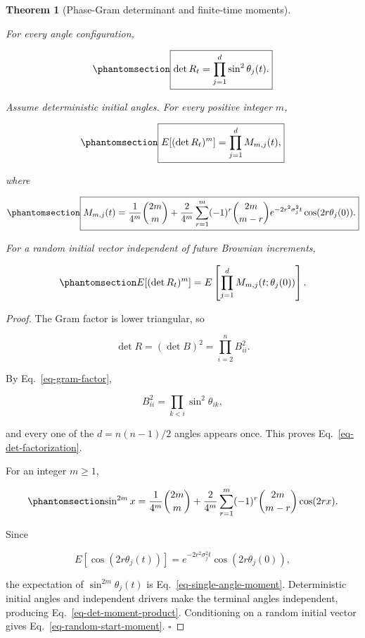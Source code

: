 \documentclass[
  english,
  11pt,
  letterpaper,
  DIV=11,
  numbers=noendperiod]{scrartcl}
\theoremstyle{plain}
\newtheorem{theorem}{Theorem}[section]
\theoremstyle{plain}
\theoremstyle{plain}
\theoremstyle{plain}
\theoremstyle{remark}
\begin{document}
\begin{theorem}[Phase-Gram determinant and finite-time
moments]\protect\hypertarget{thm-phasegram-determinant}{}\label{thm-phasegram-determinant}

For every angle configuration,

\begin{equation}\protect\phantomsection\label{eq-det-factorization}{
\boxed{
\det R_t
=\prod_{j=1}^d\sin^2\theta_j(t).
}
}\end{equation}

Assume deterministic initial angles. For every positive integer \(m\),

\begin{equation}\protect\phantomsection\label{eq-det-moment-product}{
\boxed{
E[(\det R_t)^m]
=\prod_{j=1}^dM_{m,j}(t),
}
}\end{equation}

where

\begin{equation}\protect\phantomsection\label{eq-single-angle-moment}{
\boxed{
M_{m,j}(t)
=\frac1{4^m}\binom{2m}{m}
+\frac{2}{4^m}
\sum_{r=1}^m
(-1)^r
\binom{2m}{m-r}
e^{-2r^2\sigma_j^2t}
\cos(2r\theta_j(0)).
}
}\end{equation}

For a random initial vector independent of future Brownian increments,

\begin{equation}\protect\phantomsection\label{eq-random-start-moment}{
E[(\det R_t)^m]
=E\left[\prod_{j=1}^d
M_{m,j}(t;\theta_j(0))\right].
}\end{equation}

\end{theorem}

\begin{proof}
The Gram factor is lower triangular, so

\[
\det R=(\det B)^2
=\prod_{i=2}^nB_{ii}^2.
\]

By Eq.~\ref{eq-gram-factor},

\[
B_{ii}^2
=\prod_{k<i}\sin^2\theta_{ik},
\]

and every one of the \(d=n(n-1)/2\) angles appears once. This proves
Eq.~\ref{eq-det-factorization}.

For an integer \(m\ge1\),

\begin{equation}\protect\phantomsection\label{eq-sine-power-fourier}{
\sin^{2m}x
=\frac1{4^m}\binom{2m}{m}
+\frac2{4^m}
\sum_{r=1}^m
(-1)^r\binom{2m}{m-r}\cos(2rx).
}\end{equation}

Since

\[
E[\cos(2r\theta_j(t))]
=e^{-2r^2\sigma_j^2t}\cos(2r\theta_j(0)),
\]

the expectation of \(\sin^{2m}\theta_j(t)\) is
Eq.~\ref{eq-single-angle-moment}. Deterministic initial angles and
independent drivers make the terminal angles independent, producing
Eq.~\ref{eq-det-moment-product}. Conditioning on a random initial vector
gives Eq.~\ref{eq-random-start-moment}. \(\square\)
\end{proof}
\end{document}
